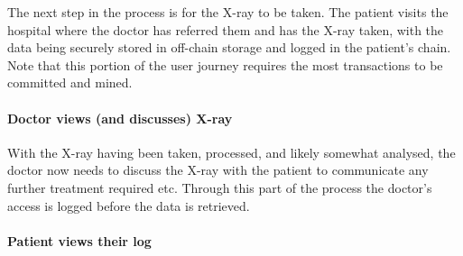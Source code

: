The next step in the process is for the X-ray to be taken. The patient visits the hospital where the doctor has referred them and has the X-ray taken, with the data being securely stored in off-chain storage and logged in the patient's chain. Note that this portion of the user journey requires the most transactions to be committed and mined.



\paragraph{Doctor views (and discusses) X-ray}

With the X-ray having been taken, processed, and likely somewhat analysed, the doctor now needs to discuss the X-ray with the patient to communicate any further treatment required etc. Through this part of the process the doctor's access is logged before the data is retrieved.



\paragraph{Patient views their log}





